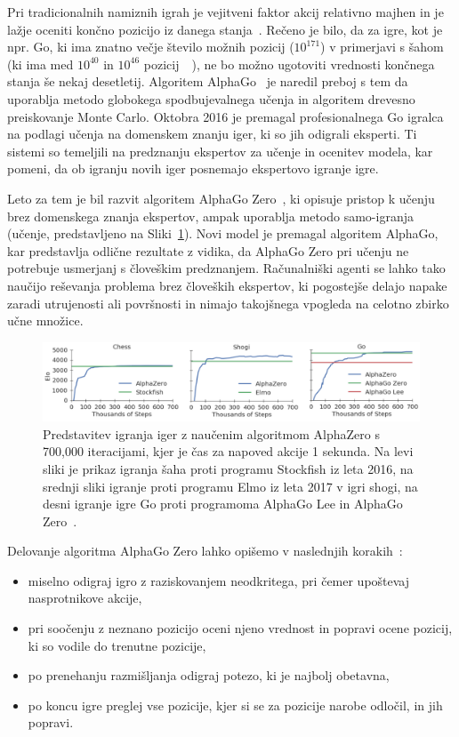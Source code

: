 \documentclass[a4paper, 12pt]{book}
\begin{document}
Pri tradicionalnih namiznih igrah je vejitveni faktor akcij relativno majhen in je lažje oceniti končno pozicijo iz danega stanja~\cite{wiki:AlphaGo}.
Rečeno je bilo, da za igre, kot je npr. Go, ki ima znatno večje število možnih pozicij ($10^{171}$) v primerjavi s šahom (ki ima med $10^{40}$ in $10^{46}$ pozicij~\cite{chinchalkar1996upper}~\cite{steinerberger2015number}), ne bo možno ugotoviti vrednosti končnega stanja še nekaj desetletij.
Algoritem AlphaGo~\cite{silver2016mastering} je naredil preboj s tem da uporablja metodo globokega spodbujevalnega učenja in algoritem drevesno preiskovanje Monte Carlo. 
Oktobra 2016 je premagal profesionalnega Go igralca na podlagi učenja na domenskem znanju iger, ki so jih odigrali eksperti.
Ti sistemi so temeljili na predznanju ekspertov za učenje in ocenitev modela, kar pomeni, da ob igranju novih iger posnemajo ekspertovo igranje igre.

Leto za tem je bil razvit algoritem AlphaGo Zero~\cite{silver2017mastering}, ki opisuje pristop k učenju brez domenskega znanja ekspertov, ampak uporablja metodo samo-igranja (učenje, predstavljeno na Sliki~\ref{picCompareGo}). 
Novi model je premagal algoritem AlphaGo, kar predstavlja odlične rezultate z vidika, da AlphaGo Zero pri učenju ne potrebuje usmerjanj s človeškim predznanjem.
Računalniški agenti se lahko tako naučijo reševanja problema brez človeških ekspertov, ki pogostejše delajo napake zaradi utrujenosti ali površnosti in nimajo takojšnega vpogleda na celotno zbirko učne množice.

\begin{figure}[h!]
	\begin{center}
		\includegraphics[width=1\textwidth]{photos/go.pdf}
	\end{center}
	\caption{Predstavitev igranja iger z naučenim algoritmom AlphaZero s 700,000 iteracijami, kjer je čas za napoved akcije 1 sekunda.
		Na levi sliki je prikaz igranja šaha proti programu Stockfish iz leta 2016, na srednji sliki igranje proti programu Elmo iz leta 2017 v igri shogi, na desni igranje igre Go proti programoma AlphaGo Lee in AlphaGo Zero~{\cite{silver2017mastering}}.
 }
	\label{picCompareGo}
\end{figure}
\noindent
Delovanje algoritma AlphaGo Zero lahko opišemo v naslednjih korakih~\cite{guid}:
\begin{itemize}
	\item miselno odigraj igro z raziskovanjem neodkritega, pri čemer upoštevaj nasprotnikove akcije,
	\item pri soočenju z neznano pozicijo oceni njeno vrednost in popravi ocene pozicij, ki so vodile do trenutne pozicije,
	\item po prenehanju razmišljanja odigraj potezo, ki je najbolj obetavna,
	\item po koncu igre preglej vse pozicije, kjer si se za pozicije narobe odločil, in jih popravi.
\end{itemize}
\end{document}
